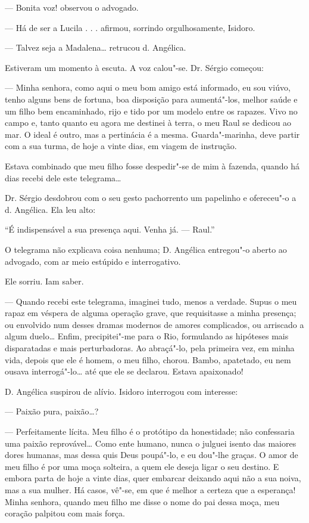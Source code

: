 --- Bonita voz! observou o advogado.

--- Há de ser a Lucila . . . afirmou, sorrindo orgulhosamente, Isidoro.

--- Talvez seja a Madalena\ldots{} retrucou d. Angélica.

Estiveram um momento à escuta. A voz calou"-se. Dr. Sérgio começou:

--- Minha senhora, como aqui o meu bom amigo está informado, eu sou
viúvo, tenho alguns bens de fortuna, boa disposição para aumentá"-los,
melhor saúde e um filho bem encaminhado, rijo e tido por um modelo entre
os rapazes. Vivo no campo e, tanto quanto eu agora me destinei à terra,
o meu Raul se dedicou ao mar. O ideal é outro, mas a pertinácia é a
mesma. Guarda"-marinha, deve partir com a sua turma, de hoje a vinte
dias, em viagem de instrução.

Estava combinado que meu filho fosse despedir"-se de mim à fazenda,
quando há dias recebi dele este telegrama\ldots{}

Dr. Sérgio desdobrou com o seu gesto pachorrento um papelinho e
ofereceu"-o a d. Angélica. Ela leu alto:

``É indispensável a sua presença aqui. Venha já. --- Raul.''

O telegrama não explicava coisa nenhuma; D. Angélica entregou"-o aberto
ao advogado, com ar meio estúpido e interrogativo.

Ele sorriu. Iam saber.

--- Quando recebi este telegrama, imaginei tudo, menos a verdade. Supus
o meu rapaz em véspera de alguma operação grave, que requisitasse a
minha presença; ou envolvido num desses dramas modernos de amores
complicados, ou arriscado a algum duelo\ldots{} Enfim, precipitei"-me para o
Rio, formulando as hipóteses mais disparatadas e mais perturbadoras. Ao
abraçá"-lo, pela primeira vez, em minha vida, depois que ele é homem, o
meu filho, chorou. Bambo, apatetado, eu nem ousava interrogá"-lo\ldots{} até
que ele se declarou. Estava apaixonado!

D. Angélica suspirou de alívio. Isidoro interrogou com interesse:

--- Paixão pura, paixão\ldots{}?

--- Perfeitamente lícita. Meu filho é o protótipo da honestidade; não
confessaria uma paixão reprovável\ldots{} Como ente humano, nunca o julguei
isento das maiores dores humanas, mas dessa quis Deus poupá"-lo, e eu
dou"-lhe graças. O amor de meu filho é por uma moça solteira, a quem ele
deseja ligar o seu destino. E embora parta de hoje a vinte dias, quer
embarcar deixando aqui não a sua noiva, mas a sua mulher. Há casos,
vê"-se, em que é melhor a certeza que a esperança! Minha senhora, quando
meu filho me disse o nome do pai dessa moça, meu coração palpitou com
mais força.

